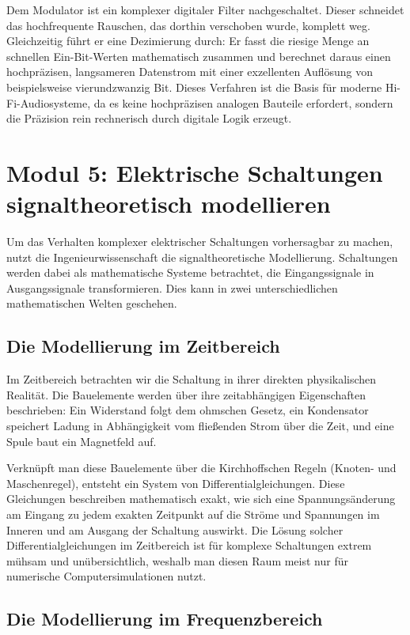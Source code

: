 \documentclass[11pt,a4paper]{article}
\begin{document}
Dem Modulator ist ein komplexer digitaler Filter nachgeschaltet. Dieser schneidet das hochfrequente Rauschen, das dorthin verschoben wurde, komplett weg. Gleichzeitig führt er eine Dezimierung durch: Er fasst die riesige Menge an schnellen Ein-Bit-Werten mathematisch zusammen und berechnet daraus einen hochpräzisen, langsameren Datenstrom mit einer exzellenten Auflösung von beispielsweise vierundzwanzig Bit. Dieses Verfahren ist die Basis für moderne Hi-Fi-Audiosysteme, da es keine hochpräzisen analogen Bauteile erfordert, sondern die Präzision rein rechnerisch durch digitale Logik erzeugt.

\newpage

\section{Modul 5: Elektrische Schaltungen signaltheoretisch modellieren}

Um das Verhalten komplexer elektrischer Schaltungen vorhersagbar zu machen, nutzt die Ingenieurwissenschaft die signaltheoretische Modellierung. Schaltungen werden dabei als mathematische Systeme betrachtet, die Eingangssignale in Ausgangssignale transformieren. Dies kann in zwei unterschiedlichen mathematischen Welten geschehen.

\subsection{Die Modellierung im Zeitbereich}

Im Zeitbereich betrachten wir die Schaltung in ihrer direkten physikalischen Realität. Die Bauelemente werden über ihre zeitabhängigen Eigenschaften beschrieben: Ein Widerstand folgt dem ohmschen Gesetz, ein Kondensator speichert Ladung in Abhängigkeit vom fließenden Strom über die Zeit, und eine Spule baut ein Magnetfeld auf.

Verknüpft man diese Bauelemente über die Kirchhoffschen Regeln (Knoten- und Maschenregel), entsteht ein System von Differentialgleichungen. Diese Gleichungen beschreiben mathematisch exakt, wie sich eine Spannungsänderung am Eingang zu jedem exakten Zeitpunkt auf die Ströme und Spannungen im Inneren und am Ausgang der Schaltung auswirkt. Die Lösung solcher Differentialgleichungen im Zeitbereich ist für komplexe Schaltungen extrem mühsam und unübersichtlich, weshalb man diesen Raum meist nur für numerische Computersimulationen nutzt.

\subsection{Die Modellierung im Frequenzbereich}
\end{document}

